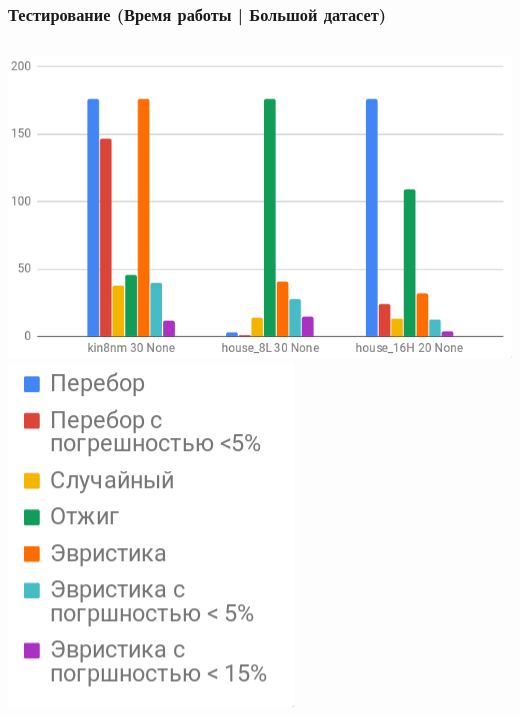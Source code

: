 \documentclass{beamer}
\begin{document}
\begin{frame}
    \frametitle{Тестирование (Время работы | Большой датасет)}
    \vfill
    \begin{columns}
        \includegraphics[width=\textwidth]{time_big.png}
        \includegraphics[width=\textwidth]{time_legend.png}
    \end{columns}
\end{frame}
\end{document}
